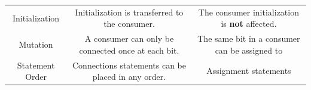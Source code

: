 \begin{table}[t!]
\begin{tabular}{|c|c|c|}
\begin{minipage}[c][1.5cm]{0.42\textwidth}
    \end{minipage} 
    \\ 
    \hline
    \begin{minipage}{0.1\textwidth}
      Initialization
    \end{minipage} 
    &
    \begin{minipage}[c][0.5cm]{0.42\textwidth}
      Initialization is transferred to the consumer.
    \end{minipage} 
    &  
    \begin{minipage}[c][0.5cm]{0.42\textwidth}
      The consumer initialization is \textbf{not} affected.
    \end{minipage} 
    \\ 
    \hline
    \begin{minipage}{0.1\textwidth}
      \flushleft
      Mutation
    \end{minipage} 
    &
    \begin{minipage}[c][0.5cm]{0.42\textwidth}
      A consumer can only be connected once at each bit.
    \end{minipage} 
    &  
    \begin{minipage}[c][0.5cm]{0.42\textwidth}
      The same bit in a consumer can be assigned to 
    \end{minipage} 
    \\ 
    \hline
    \begin{minipage}{0.1\textwidth}
      \flushleft
      Statement Order
    \end{minipage} 
    &
    \begin{minipage}[c][0.8cm]{0.42\textwidth}
      Connections statements can be placed in any order.
    \end{minipage} 
    &  
    \begin{minipage}[c][0.8cm]{0.42\textwidth}
      Assignment statements
    \end{minipage}%
    \\ 
    \hline
  \end{tabular}%
\end{table}
